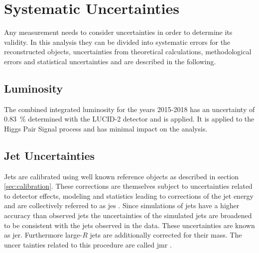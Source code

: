 \chapter{Systematic Uncertainties}
Any measurement needs to consider uncertainties in order to determine its validity. In this analysis they can be divided into systematic errors for the reconstructed objects, uncertainties from theoretical calculations, methodological errors and statistical uncertainties and are described in the following.

\section{Luminosity}
The combined integrated luminosity for the years 2015-2018 has an uncertainty of \qty[]{0.83}{\percent} determined with the LUCID-2 detector and is applied. It is applied to the Higgs Pair Signal process and has minimal impact on the analysis.

\section{Jet Uncertainties}
Jets are calibrated using well known reference objects as described in section \ref{sec:calibration}. These corrections are themselves subject to uncertainties related to detector effects, modeling and statistics leading to corrections of the jet energy and are collectively referred to as \ac{jes} \citep{atlas2021jet,Aaboud:2019aa}. Since simulations of jets have a higher accuracy than observed jets the uncertainties of the simulated jets are broadened to be consistent with the jets observed in the data. These uncertainties are known as \ac{jer}. Furthermore large-$R$ jets are additionally corrected for their mass. The uncer tainties related to this procedure are called \ac{jmr} \citep{ATLAS-CONF-2020-022}.

